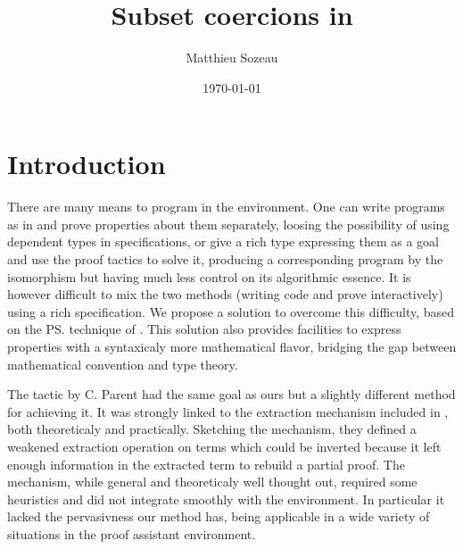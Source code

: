 \documentclass{llncs}
\author{Matthieu Sozeau\inst{1}}
\institute{LRI, Paris Sud XI University\\\email{sozeau@lri.fr}}
\title{Subset coercions in \Coq}
\date{\today}
\begin{document}
\maketitle


\section{Introduction}
There are many means to program in the \Coq{} environment. One
can write programs as in \ML{} and prove properties about them
separately, loosing the possibility of using dependent types in
specifications, or give a rich type expressing them as a goal and use the
proof tactics to solve it, producing a corresponding program by the
\CurryHoward isomorphism but having much less control on its algorithmic
essence. It is however difficult to mix the two methods
(writing code and prove interactively) using a rich specification. We
propose a solution to overcome this difficulty, based on the \ps{}
\cite{Shankar&Owre:WADT99} technique of \PVS{}
\cite{PVS:Language,PVS-Semantics:TR}. This solution also provides
facilities to express properties with a syntaxicaly more mathematical flavor,
bridging the gap between mathematical convention and type theory.

The \Program{} tactic by C. Parent \cite{conf/mpc/Parent95} had the same
goal as ours but a slightly different method for achieving it. It was strongly
linked to the extraction mechanism included in \Coq, both theoreticaly
and practically. Sketching the mechanism, they defined a weakened
extraction operation on \CIC{} terms which could be inverted because it left enough
information in the extracted term to rebuild a partial proof. The
mechanism, while general and theoreticaly well thought out, required
some heuristics and did not integrate smoothly with the \Coq{}
environment. In particular it lacked the pervasivness our method has,
being applicable in a wide variety of situations in the proof assistant
environment.
\end{document}
